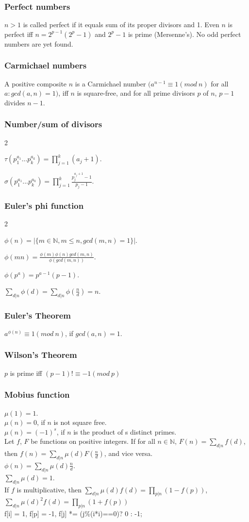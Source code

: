 \documentclass[a4paper,12pt]{article}
\newcommand\includefile[4]{
  \subsubsection{#2}
  \begin{multicols}{2}
    
  \end{multicols}
}
\begin{document}
\subsubsection{Perfect numbers}
$n > 1$ is called perfect if it equals sum of its proper divisors and 1. Even $n$ is perfect iff $n = 2^{p-1}(2^{p} - 1)$ and $2^{p} - 1$ is prime (Mersenne’s). No odd perfect numbers are yet found.

\subsubsection{Carmichael numbers}
A positive composite $n$ is a Carmichael number $(a^{n-1} \equiv 1 (mod\ n)$ for all $a: gcd(a,n) = 1)$, iff $n$ is square-free, and for all prime divisors $p$ of $n$, $p-1$ divides $n-1$.

\newpage

\includefile{c++}{Number/sum of divisors}{meh}{sigma.cpp}
$\tau(p_1^{a_1}...p_k^{a_k}) = \prod_{j=1}^{k}(a_j + 1).$

$\sigma(p_1^{a_1}...p_k^{a_k}) = \prod_{j=1}^{k}\frac{p_{j}^{a_j+1}-1}{p_j-1}.$

\includefile{c++}{Euler's phi function}{meh}{phi.cpp}

$\phi(n) = |\{m \in \mathbb{N}, m \leq n, gcd(m,n) = 1\}|$.

$\phi(mn) = \frac{\phi(m)\phi(n)gcd(m,n)}{\phi(gcd(m,n))}$.

$\phi(p^a) = p^{a-1}(p-1)$.

$\sum_{d|n}\phi(d) = \sum_{d|n}\phi(\frac{n}{d}) = n$.

\subsubsection{Euler's Theorem} 
$a^{\phi(n)} \equiv 1 (mod\ n)$, if $gcd(a,n) = 1$.

\subsubsection{Wilson's Theorem} 
$p$ is prime iff $(p-1)! \equiv -1 (mod\ p)$

\subsubsection{Mobius function}
$\mu(1) = 1$.\\
$\mu(n) = 0$, if $n$ is not square free.\\
$\mu(n) = (-1)^{s}$, if $n$ is the product of s distinct primes.\\
Let $f$, $F$ be functions on positive integers. If for all $n \in \mathbb{N}$, $F(n) = \sum_{d|n}f(d)$, then $f(n) = \sum_{d|n}\mu(d)F(\frac{n}{d})$, and vice versa.\\
$\phi(n) = \sum_{d|n}\mu(d)\frac{n}{d}$.\\
$\sum_{d|n}\mu(d) = 1$.\\
If $f$ is multiplicative, then $\sum_{d|n}\mu(d)f(d) = \prod_{p|n}(1-f(p))$, $\sum_{d|n}\mu(d)^2f(d) = \prod_{p|n}(1+f(p))$\\
f[i] = 1, f[p] = -1, f[j] *= (j\%(i*i)==0)? 0 : -1;
\end{document}
